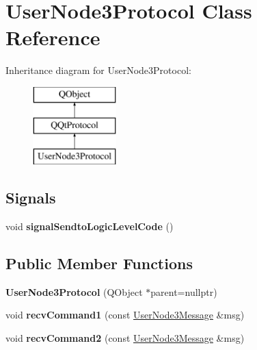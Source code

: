 \hypertarget{class_user_node3_protocol}{}\section{User\+Node3\+Protocol Class Reference}
\label{class_user_node3_protocol}
Inheritance diagram for User\+Node3\+Protocol\+:\begin{figure}[H]
\begin{center}
\leavevmode
\includegraphics[height=3.000000cm]{class_user_node3_protocol}
\end{center}
\end{figure}
\subsection*{Signals}
\begin{DoxyCompactItemize}
\item 
\mbox{\label{class_user_node3_protocol_a65ed4aac2f54417ef289a205e7a9ae7e}} 
void {\bfseries signal\+Sendto\+Logic\+Level\+Code} ()
\end{DoxyCompactItemize}
\subsection*{Public Member Functions}
\begin{DoxyCompactItemize}
\item 
\mbox{\label{class_user_node3_protocol_a13f1eb5c237216fd2a31598966806adb}} 
{\bfseries User\+Node3\+Protocol} (Q\+Object $\ast$parent=nullptr)
\item 
\mbox{\label{class_user_node3_protocol_a1ea5a492058b5c1eeb30a851187b9c77}} 
void {\bfseries recv\+Command1} (const \mbox{\hyperlink{class_user_node3_message}{User\+Node3\+Message}} \&msg)
\item 
\mbox{\label{class_user_node3_protocol_a1f7010033124c35d75e4d543b2e10267}} 
void {\bfseries recv\+Command2} (const \mbox{\hyperlink{class_user_node3_message}{User\+Node3\+Message}} \&msg)
\end{DoxyCompactItemize}
